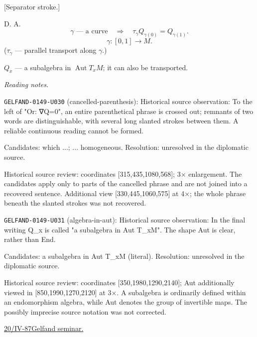 [Separator stroke.]

D. A.
\begin{equation*}
\gamma\text{ --- a curve}\quad\Rightarrow\quad
\tau_\gamma Q_{\gamma(0)}=Q_{\gamma(1)}.
\end{equation*}
\begin{equation*}
\gamma:[0,1]\to M.
\end{equation*}
($\tau_\gamma$ --- parallel transport along $\gamma$.)

$Q_x$ --- a subalgebra in $\operatorname{Aut}T_xM$;
it can also be transported.


\par\smallskip\noindent\textit{Reading notes.}\par
\noindent\texttt{GELFAND-0149-U030} (cancelled-parenthesis): Historical source observation: To the left of "Or: ∇Q=0", an entire parenthetical phrase is crossed out; remnants of two words are distinguishable, with several long slanted strokes between them. A reliable continuous reading cannot be formed.\par
Candidates: which ...; ... homogeneous. Resolution: unresolved in the diplomatic source.\par
Historical source review: coordinates [315,435,1080,568]; 3× enlargement. The candidates apply only to parts of the cancelled phrase and are not joined into a recovered sentence. Additional view [330,445,1060,575] at 4×; the whole phrase beneath the slanted strokes was not recovered.\par

\noindent\texttt{GELFAND-0149-U031} (algebra-in-aut): Historical source observation: In the final writing Q\_x is called "a subalgebra in Aut T\_xM". The shape Aut is clear, rather than End.\par
Candidates: a subalgebra in Aut T\_xM (literal). Resolution: unresolved in the diplomatic source.\par
Historical source review: coordinates [350,1980,1290,2140]; Aut additionally viewed in [850,1990,1270,2120] at 3×. A subalgebra is ordinarily defined within an endomorphism algebra, while Aut denotes the group of invertible maps. The possibly imprecise source notation was not corrected.\par



\underline{20/IV-87}\qquad\underline{Gelfand seminar.}

